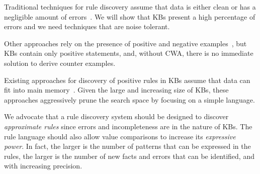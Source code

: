 \noindent {}
Traditional techniques for rule discovery assume that data is either clean or has a negligible amount of errors~\cite{abiteboul1995foundations,huhtala1999tane,chu2013discovering}. We will show that KBs present a high percentage of errors and we need techniques that are noise tolerant.

\noindent {}
Other approaches rely on the presence of positive and negative examples~\cite{dehaspe1999discovery,muggleton1994inductive}, but KBs contain only positive statements, and, without CWA, there is no immediate solution to derive %
counter examples.


\noindent {}
Existing approaches for discovery of positive rules in KBs assume that data can fit into main memory~\cite{abedjan2014amending,galarraga2015fast,Chen:2016,DBLP:conf/sigmod/FaridRIHC16}. Given the large and increasing size of KBs, these approaches aggressively prune the search space by focusing on a simple language.



We advocate that a rule discovery system should be designed to discover {\em approximate rules} since errors and incompleteness are in the nature of KBs. The rule language should also allow value comparisons to increase its {\em expressive power}.
In fact, the larger is the number of patterns that can be expressed in the rules, %
the larger is the number of new facts and errors that can be identified, and with increasing precision. 

